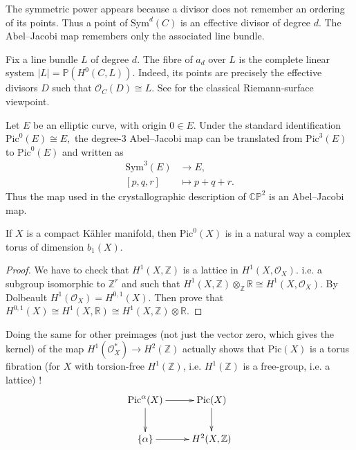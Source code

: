 \noindent
The symmetric power appears because a divisor
does not remember an ordering of its points.
Thus a point of $\text{Sym}^d(C)$ is an
effective divisor of degree $d$. The
Abel--Jacobi map remembers only the
associated line bundle.

\begin{remark}
\label{remark-abel-jacobi-fibres}
Fix a line bundle $L$ of degree $d$.
The fibre of $a_d$ over $L$ is the complete
linear system
$
|L|=\mathbb{P}(H^0(C,L)).
$
Indeed, its points are precisely the
effective divisors $D$ such that
$
\mathcal{O}_C(D)\cong L.
$
See \cite{Donaldson} for the classical
Riemann-surface viewpoint.
\end{remark}

\begin{example}
\label{example-abel-jacobi-elliptic}
Let $E$ be an elliptic curve, with origin
$0\in E$. Under the standard identification
$
\text{Pic}^0(E)\cong E,
$
the degree-$3$ Abel--Jacobi map can be
translated from $\text{Pic}^3(E)$ to
$\text{Pic}^0(E)$ and written as
$$
\begin{aligned}
\text{Sym}^3(E)&\longrightarrow E,\\
[p,q,r]&\longmapsto p+q+r.
\end{aligned}
$$
Thus the map used in the crystallographic
description of $\mathbb{CP}^2$ is an
Abel--Jacobi map.
\end{example}

\begin{lemma}
\label{lemma-jacobian-is-torus}
If $X$ is a compact Kähler manifold,
then $\text{Pic}^0(X)$ is in a natural
way a complex torus of dimension $b_1(X)$.
\end{lemma}

\begin{proof}
We have to check that $H^1(X,\mathbb{Z})$
is a lattice in $H^1(X,\mathcal{O}_X)$.
i.e. a subgroup isomorphic
to $\mathbb{Z}^r$
and such that 
$H^1(X,\mathbb{Z}) 
\otimes_\mathbb{Z}
\mathbb{R}
\cong H^1(X,\mathcal{O}_X)$.
By Dolbeault
$H^1(\mathcal{O}_X)
=H^{0,1}(X)$.
Then prove that $H^{0,1}(X)
\cong H^1(X,\mathbb{R})
\cong H^1(X,\mathbb{Z}) \otimes \mathbb{R}$.
\end{proof}

\noindent
Doing the same for other preimages
(not just the vector zero, which 
gives the kernel)
of the map
$H^1(\mathcal{O}_X^*) \to H^2(\mathbb{Z})$
actually shows that $\text{Pic}(X)$
is a torus fibration
(for $X$ with torsion-free $H^1(\mathbb{Z})$,
i.e. $H^1(\mathbb{Z})$ is a free-group,
i.e. a lattice)
!
$$
\xymatrix{
\text{Pic}^\alpha(X)\ar[r]\ar[d]
&\text{Pic}(X)\ar[d]\\
\{\alpha\}\ar[r]
&H^2(X,\mathbb{Z})
}
$$

